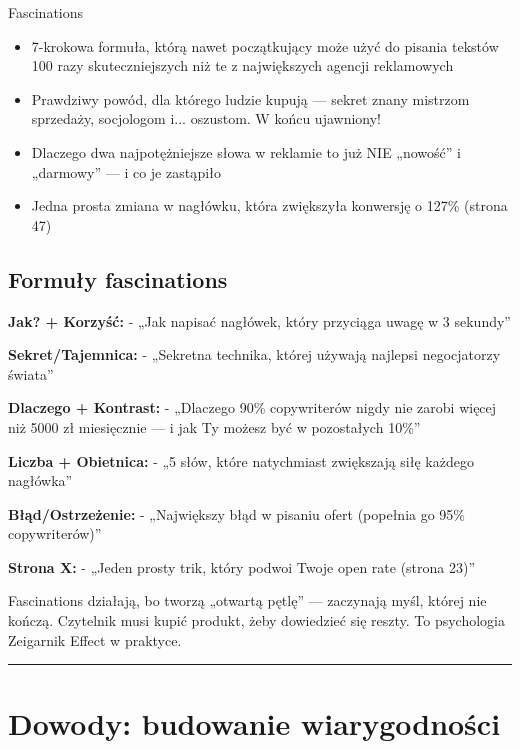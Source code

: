 \documentclass[
  12pt,
  a4paper,
  twoside,
  openright,
  12pt,
  DIV=12,
  BCOR=12mm]{scrbook}
\newcommand{\decoline}{%
  \begin{center}
    \textcolor{bordergray}{\rule{0.3\textwidth}{0.5pt}}
  \end{center}
}
\begin{document}
\begin{przyklad}{Fascinations}
\begin{itemize}
  \item 7-krokowa formuła, którą nawet początkujący może użyć do pisania tekstów 100 razy skuteczniejszych niż te z największych agencji reklamowych
  \item Prawdziwy powód, dla którego ludzie kupują --- sekret znany mistrzom sprzedaży, socjologom i... oszustom. W końcu ujawniony!
  \item Dlaczego dwa najpotężniejsze słowa w reklamie to już NIE „nowość” i „darmowy” --- i co je zastąpiło
  \item Jedna prosta zmiana w nagłówku, która zwiększyła konwersję o 127\% (strona 47)
\end{itemize}
\end{przyklad}

\subsection{Formuły fascinations}\label{formuux142y-fascinations}

\textbf{Jak? + Korzyść:} - „Jak napisać nagłówek, który przyciąga uwagę
w 3 sekundy''

\textbf{Sekret/Tajemnica:} - „Sekretna technika, której używają najlepsi
negocjatorzy świata''

\textbf{Dlaczego + Kontrast:} - „Dlaczego 90\% copywriterów nigdy nie
zarobi więcej niż 5000 zł miesięcznie --- i jak Ty możesz być w
pozostałych 10\%''

\textbf{Liczba + Obietnica:} - „5 słów, które natychmiast zwiększają
siłę każdego nagłówka''

\textbf{Błąd/Ostrzeżenie:} - „Największy błąd w pisaniu ofert (popełnia
go 95\% copywriterów)''

\textbf{Strona X:} - „Jeden prosty trik, który podwoi Twoje open rate
(strona 23)''

\begin{wazne}
Fascinations działają, bo tworzą „otwartą pętlę” --- zaczynają myśl, której nie kończą. Czytelnik musi kupić produkt, żeby dowiedzieć się reszty. To psychologia Zeigarnik Effect w praktyce.
\end{wazne}

\decoline

\section{Dowody: budowanie
wiarygodności}\label{dowody-budowanie-wiarygodnoux15bci}
\end{document}
